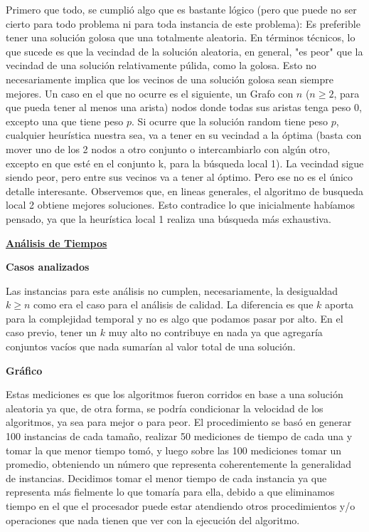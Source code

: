 \documentclass[10pt,a4paper]{article}
\begin{document}
Primero que todo, se cumplió algo que es bastante lógico (pero que puede no ser cierto para todo problema ni para toda instancia de este problema): Es preferible tener una solución golosa que una totalmente aleatoria. En términos técnicos, lo que sucede es que la vecindad de la solución aleatoria, en general, "es peor" que la vecindad de una solución relativamente púlida, como la golosa. Esto no necesariamente implica que los vecinos de una solución golosa sean siempre mejores. Un caso en el que no ocurre es el siguiente, un Grafo con $n$ ($n \geq 2$, para que pueda tener al menos una arista) nodos donde todas sus aristas tenga peso $0$, excepto una que tiene peso $p$. Si ocurre que la solución random tiene peso $p$, cualquier heurística nuestra sea, va a tener en su vecindad a la óptima (basta con mover uno de los 2 nodos a otro conjunto o intercambiarlo con algún otro, excepto en que esté en el conjunto k, para la búsqueda local 1). La vecindad sigue siendo peor, pero entre sus vecinos va a tener al óptimo.\newline
\indent Pero ese no es el único detalle interesante. Observemos que, en lineas generales, el algoritmo de busqueda local 2 obtiene mejores soluciones. Esto contradice lo que inicialmente habíamos pensado, ya que la heurística local 1 realiza una búsqueda más exhaustiva.

\newpage
\noindent \textbf{\underline{Análisis de Tiempos}}

\textbf{Casos analizados}

Las instancias para este análisis no cumplen, necesariamente, la desigualdad $k \geq n$ como era el caso para el análisis de calidad. La diferencia es que $k$ aporta para la complejidad temporal y no es algo que podamos pasar por alto. En el caso previo, tener un $k$ muy alto no contribuye en nada ya que agregaría conjuntos vacíos que nada sumarían al valor total de una solución.

\textbf{Gráfico}

Estas mediciones es que los algoritmos fueron corridos en base a una solución aleatoria ya que, de otra forma, se podría condicionar la velocidad de los algoritmos, ya sea para mejor o para peor. El procedimiento se basó en generar 100 instancias de cada tamaño, realizar 50 mediciones de tiempo de cada una y tomar la que menor tiempo tomó, y luego sobre las 100 mediciones tomar un promedio, obteniendo un número que representa coherentemente la generalidad de instancias. Decidimos tomar el menor tiempo de cada instancia ya que representa más fielmente lo que tomaría para ella, debido a que eliminamos tiempo en el que el procesador puede estar atendiendo otros procedimientos y/o operaciones que nada tienen que ver con la ejecución del algoritmo.
\end{document}
